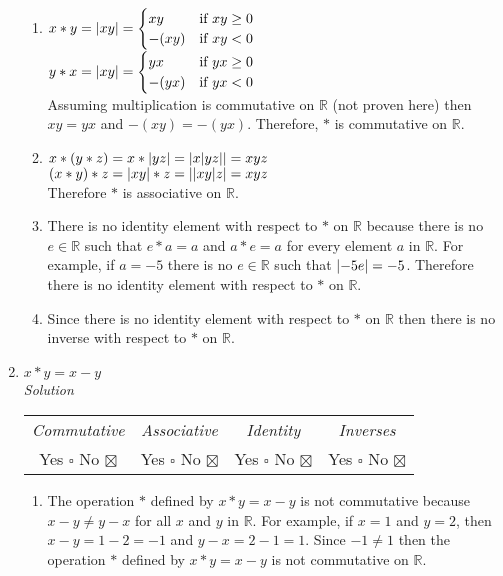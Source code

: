 \documentclass[12pt]{article}
\DeclarePairedDelimiter{\abs}{\lvert}{\rvert}
\begin{document}
\begin{flushleft}
\begin{enumerate}
	\begin{enumerate}
	\item $x * y = \abs{xy}  = \begin{cases} xy &\mbox{if } xy \geq 0 \\ -(xy) &\mbox{if } xy < 0\end{cases} $ \\
	$y * x = \abs{xy}  = \begin{cases} yx &\mbox{if } yx \geq 0 \\ -(yx) &\mbox{if } yx < 0\end{cases} $ \\
	Assuming multiplication is commutative on $\mathbb{R}$ (not proven here) then $xy = yx$ and $-(xy) = -(yx)$. Therefore, $*$ is commutative on $\mathbb{R}$.
	
	\item $ x * (y * z) = x * \abs{yz} = \abs{x \abs{yz}} = xyz$ \\
	$ (x * y) * z = \abs{xy} * z = \abs{\abs{xy}z} = xyz$ \\
	Therefore $*$ is associative on $\mathbb{R}$.
	
	\item There is no identity element with respect to $*$ on $\mathbb{R}$ because there is no $e \in \mathbb{R}$ such that $e * a = a$ and $a * e = a$ for every element $a$ in $\mathbb{R}$. For example, if $a = -5$ there is no $e \in \mathbb{R}$ such that $\abs{-5e} = -5$. Therefore there is no identity element with respect to $*$ on $\mathbb{R}$. 
	
	\item Since there is no identity element with respect to $*$ on $\mathbb{R}$ then there is no inverse with respect to $*$ on $\mathbb{R}$.
	\end{enumerate} 


\item $x * y = x - y $ \\
	\medskip
	\textit{Solution}
	\medskip
	
	\begin{tabular}{c c c c}
	\textit{Commutative} & \textit{Associative} & \textit{Identity} & \textit{Inverses} \\
	Yes $\square$ No $\boxtimes$ & Yes $\square$ No $\boxtimes$ & Yes $\square$  No $\boxtimes$ & Yes $\square$ No $\boxtimes$ \\
	\end{tabular}
	
	\begin{enumerate}
	\item The operation $*$ defined by $x * y = x - y$ is not commutative because $x - y \neq y - x$ for all $x$ and $y$ in $\mathbb{R}$. For example, if $x = 1$ and $y = 2$, then $x - y = 1 - 2 = -1$ and $y - x = 2 - 1 = 1$. Since $-1 \neq 1$ then the operation $*$ defined by $x * y = x - y$ is not commutative on $\mathbb{R}$.
	

\end{enumerate}
\end{enumerate}
\end{flushleft}
\end{document}
